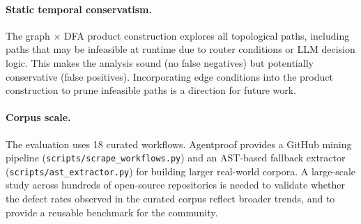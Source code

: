 \paragraph{Static temporal conservatism.}
The graph $\times$ DFA product construction explores all topological
paths, including paths that may be infeasible at runtime due to router
conditions or LLM decision logic.  This makes the analysis sound
(no false negatives) but potentially conservative (false positives).
Incorporating edge conditions into the product construction to prune
infeasible paths is a direction for future work.

\paragraph{Corpus scale.}
The evaluation uses 18 curated workflows. Agentproof provides a GitHub mining
pipeline (\texttt{scripts/\allowbreak scrape\_workflows.py}) and an AST-based
fallback extractor (\texttt{scripts/\allowbreak ast\_extractor.py}) for building
larger real-world corpora. A large-scale study across hundreds of
open-source repositories is needed to validate whether the defect rates
observed in the curated corpus reflect broader trends, and to provide a
reusable benchmark for the community.

